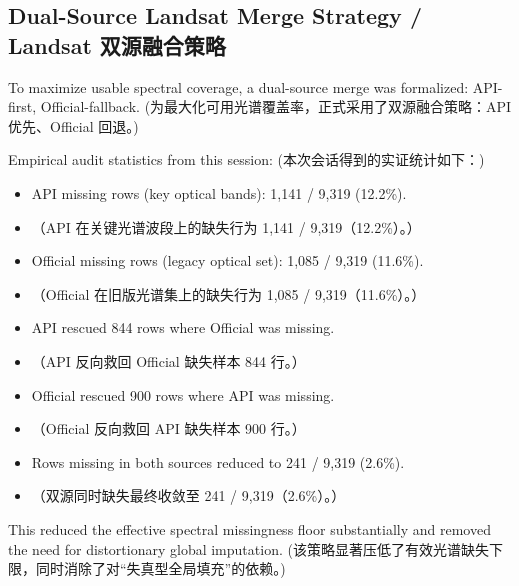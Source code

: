 \subsection{Dual-Source Landsat Merge Strategy / Landsat 双源融合策略}
To maximize usable spectral coverage, a dual-source merge was formalized: API-first, Official-fallback.
(为最大化可用光谱覆盖率，正式采用了双源融合策略：API 优先、Official 回退。)

Empirical audit statistics from this session:
(本次会话得到的实证统计如下：)
\begin{itemize}
    \item API missing rows (key optical bands): 1,141 / 9,319 (12.2\%).
    \item （API 在关键光谱波段上的缺失行为 1,141 / 9,319（12.2\%）。）
    \item Official missing rows (legacy optical set): 1,085 / 9,319 (11.6\%).
    \item （Official 在旧版光谱集上的缺失行为 1,085 / 9,319（11.6\%）。）
    \item API rescued 844 rows where Official was missing.
    \item （API 反向救回 Official 缺失样本 844 行。）
    \item Official rescued 900 rows where API was missing.
    \item （Official 反向救回 API 缺失样本 900 行。）
    \item Rows missing in both sources reduced to 241 / 9,319 (2.6\%).
    \item （双源同时缺失最终收敛至 241 / 9,319（2.6\%）。）
\end{itemize}

This reduced the effective spectral missingness floor substantially and removed the need for distortionary global imputation.
(该策略显著压低了有效光谱缺失下限，同时消除了对“失真型全局填充”的依赖。)

